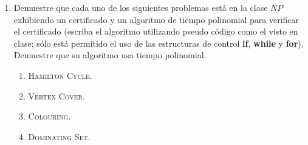 \documentclass{article}
\begin{document}
\begin{enumerate}
\begin{enumerate}
\begin{proof}
      \hspace*{2cm} $\therefore\;$ Si $D$ es ac\'iclica tiene al menos una fuente y un sumidero.
    \end{proof}
  \item Deduzca que una digr\'afica admite un orden topol\'ogico si y s\'olo
    si es ac\'iclica.
    \begin{proof}
      Para este inciso analicemos $2$ posibles casos:
      \begin{itemize}
      \item[$\Rightarrow$)]
      \item[$\Leftarrow$)]
      \end{itemize}
    \end{proof}
  \item Exhiba un algoritmo de tiempo a lo m\'as cuadr\'atico para encontrar
    un orden topol\'ogico en una digr\'afica ac\'iclica.
  \end{enumerate}
\item Demuestre que cada uno de los siguientes problemas est\'a en la clase
  $NP$ exhibiendo un certificado y un algoritmo de tiempo polinomial para
  verificar el certificado (escriba el algoritmo utilizando pseudo c\'odigo
  como el visto en clase; s\'olo est\'a permitido el uso de las estructuras de
  control {\bf if}, {\bf while} y {\bf for}).   Demuestre que su algoritmo
  usa tiempo polinomial.
  \begin{enumerate}
  \item \textsc{Hamilton Cycle}.
  \item \textsc{Vertex Cover}.
  \item \textsc{Colouring}.
  \item \textsc{Dominating Set}.
  \end{enumerate}
\end{enumerate}
\end{document}
